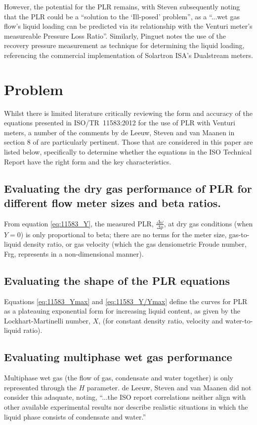 \documentclass[journal]{IEEEtran}
\begin{document}
However, the potential for the \acrlong{PLR} remains, with Steven \cite{Steven2018OrificeProblem} subsequently noting that the \acrshort{PLR} could be a ``solution to the `Ill-posed' problem'', as a ``...wet gas flow’s liquid loading can be predicted via its relationship with the Venturi meter’s measureable Pressure Loss Ratio''.  Similarly, Pinguet \cite{Pinguet2018ExtensiveConditions} notes the use of the recovery pressure measurement as technique for determining the liquid loading, referencing the commercial implementation of Solartron ISA's Dualstream meters.

\section{Problem}

Whilst there is limited literature critically reviewing the form and accuracy of the equations presented in ISO/TR~11583:2012 for the use of \acrlong{PLR} with Venturi meters, a number of the comments by de Leeuw, Steven and van Maanen in section 8 of \cite{DeLeeuw2011} are particularly pertinent.  Those that are considered in this paper are listed below, specifically to determine whether the equations in the ISO Technical Report have the right form and the key characteristics.

\subsection{Evaluating the dry gas performance of \acrshort{PLR} for different flow meter sizes and beta ratios.}
From equation \ref{eq:11583_Y}, the measured \acrshort{PLR}, $\frac{\Delta \omega}{\Delta p}$, at dry gas conditions (when $Y=0$) is only proportional to beta; there are no terms for the meter size, gas-to-liquid density ratio, or gas velocity (which the gas densiometric Froude number, \acrshort{Frg}, represents in a non-dimensional manner).

\subsection{Evaluating the shape of the PLR equations}
Equations \ref{eq:11583_Ymax} and \ref{eq:11583_Y/Ymax} define the curves for \acrshort{PLR} as a plateauing exponential form for increasing liquid content, as given by the Lockhart-Martinelli number, $X$, (for constant density ratio, velocity and water-to-liquid ratio).

\subsection{Evaluating multiphase wet gas performance}
Multiphase wet gas (the flow of gas, condensate and water together) is only represented through the $H$ parameter.  de Leeuw, Steven and van Maanen did not consider this adaquate, noting, ``...the ISO report correlations neither align with other available experimental results nor describe realistic situations in which the liquid phase consists of condensate and water.''
\end{document}
